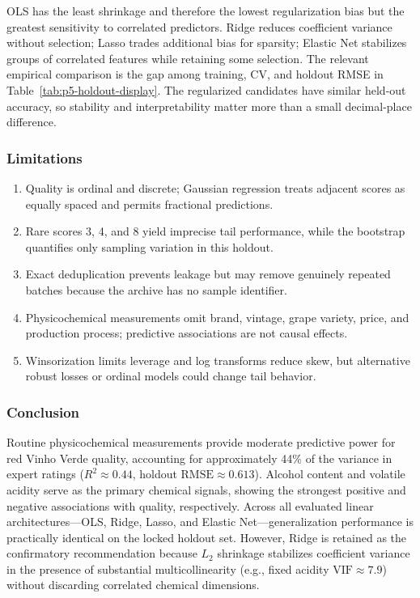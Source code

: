 \documentclass[
  10pt,
]{article}
\providecommand{\tightlist}{%
  \setlength{\itemsep}{0pt}\setlength{\parskip}{0pt}}
\begin{document}
OLS has the least shrinkage and therefore the lowest regularization bias
but the greatest sensitivity to correlated predictors. Ridge reduces
coefficient variance without selection; Lasso trades additional bias for
sparsity; Elastic Net stabilizes groups of correlated features while
retaining some selection. The relevant empirical comparison is the gap
among training, CV, and holdout RMSE in Table~\ref{tab:p5-holdout-display}. The regularized candidates have similar
held-out accuracy, so stability and interpretability matter more than a
small decimal-place difference.

\subsubsection{Limitations}\label{limitations}

\begin{enumerate}
\def\labelenumi{\arabic{enumi}.}
\tightlist
\item
  Quality is ordinal and discrete; Gaussian regression treats adjacent
  scores as equally spaced and permits fractional predictions.
\item
  Rare scores 3, 4, and 8 yield imprecise tail performance, while the
  bootstrap quantifies only sampling variation in this holdout.
\item
  Exact deduplication prevents leakage but may remove genuinely repeated
  batches because the archive has no sample identifier.
\item
  Physicochemical measurements omit brand, vintage, grape variety,
  price, and production process; predictive associations are not causal
  effects.
\item
  Winsorization limits leverage and log transforms reduce skew, but
  alternative robust losses or ordinal models could change tail
  behavior.
\end{enumerate}

\subsubsection{Conclusion}\label{conclusion}

Routine physicochemical measurements provide moderate predictive power
for red Vinho Verde quality, accounting for approximately 44\% of the
variance in expert ratings (\(R^2 \approx 0.44\), holdout
\(\text{RMSE} \approx 0.613\)). Alcohol content and volatile acidity
serve as the primary chemical signals, showing the strongest positive
and negative associations with quality, respectively. Across all
evaluated linear architectures---OLS, Ridge, Lasso, and Elastic
Net---generalization performance is practically identical on the locked
holdout set. However, Ridge is retained as the confirmatory
recommendation because \(L_2\) shrinkage stabilizes coefficient variance
in the presence of substantial multicollinearity (e.g., fixed acidity
\(\text{VIF} \approx 7.9\)) without discarding correlated chemical
dimensions.
\end{document}
